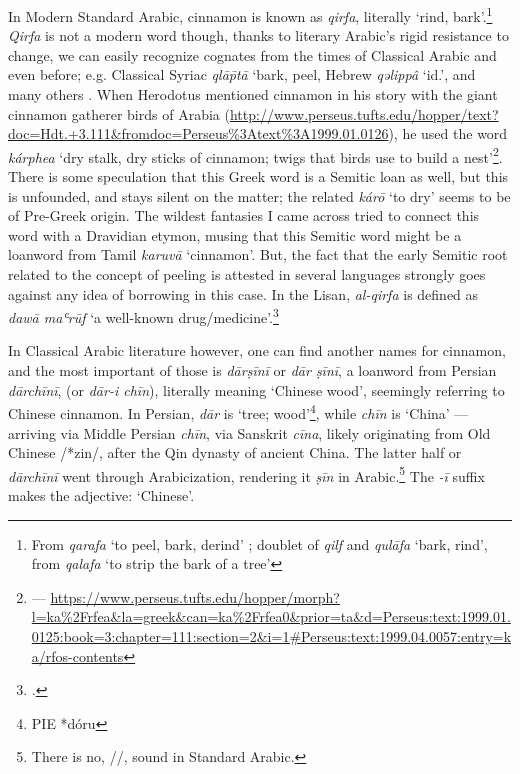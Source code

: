 In Modern Standard Arabic, cinnamon is known as 
\textit{qirfa}, literally `rind, bark'.\footnote{From \textit{qarafa} `to peel, bark, derind' ; doublet of \textit{qilf} and \textit{qulāfa} `bark, rind', from \textit{qalafa} `to strip the bark of a tree' } \textit{Qirfa} is not a modern word though, thanks to literary Arabic's rigid resistance to change, we can easily recognize cognates from the times of Classical Arabic and even before; e.g. Classical Syriac  \textit{qlāp̄tā} `bark, peel, Hebrew  \textit{qəlippâ} `id.', and many others \parencite[see][427]{leslau_comparative_1991}.
When Herodotus mentioned cinnamon in his story with the giant cinnamon gatherer birds of Arabia (\href{3.111}{http://www.perseus.tufts.edu/hopper/text?doc=Hdt.+3.111\&fromdoc=Perseus\%3Atext\%3A1999.01.0126}), he used the word  \textit{kárphea} `dry stalk, dry sticks of cinnamon; twigs that birds use to build a nest'\footnote{ --- \url{https://www.perseus.tufts.edu/hopper/morph?l=ka\%2Frfea\&la=greek\&can=ka\%2Frfea0\&prior=ta\&d=Perseus:text:1999.01.0125:book=3:chapter=111:section=2\&i=1\#Perseus:text:1999.04.0057:entry=ka/rfos-contents}}. There is some speculation that this Greek word is a Semitic loan as well, but this is unfounded, and \textcite{beekes_etymological_2010} stays silent on the matter; the related \textit{kárō} `to dry' seems to be of Pre-Greek origin. The wildest fantasies I came across tried to connect this word with a Dravidian etymon, musing that this Semitic word might be a loanword from Tamil  \textit{karuvā} `cinnamon'.
But, the fact that the early Semitic root related to the concept of peeling is attested in several languages strongly goes against any idea of borrowing in this case. In the \gls{Lisan}, \textit{al-qirfa} is defined as \textit{daw\={a} maʿr\={u}f} `a well-known drug/medicine'.\footcite[3599 ]{ibn_manzur_lisan_1979}



In Classical Arabic literature however, one can find another names for cinnamon, and the most important of those is  
\textit{dārṣīnī} or  
\textit{dār ṣīnī}, a loanword from Persian 
\textit{dārchīnī}, (or  
\textit{dār-i chīn}), literally meaning `Chinese wood', seemingly referring to Chinese cinnamon. In Persian, \textit{dār} is `tree; wood'\footnote{\gls{PIE} *dóru}, while \textit{chīn} is `China' --- arriving via Middle Persian \textit{chīn}, via Sanskrit  \textit{cīna}, likely originating from Old Chinese  /*zin/, after the Qin dynasty of ancient China. The latter half or \textit{dārchīnī} went through Arabicization, rendering it \textit{ṣīn} in Arabic.\footnote{There is no, /\textipa{\t{\textteshlig}}/, sound in Standard Arabic.} The \textit{-ī} suffix makes the adjective: `Chinese'. 

